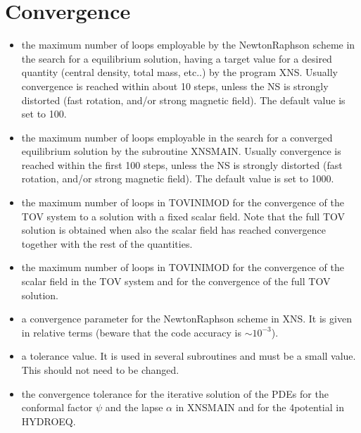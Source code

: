 \documentclass[letterpaper,10pt,english]{sphinxmanual}
\begin{document}
\section{Convergence}
\label{\detokenize{user_params:convergence}}\begin{itemize}
\item {} 
\sphinxAtStartPar
{} \sphinxhyphen{} the maximum number of loops employable by the Newton\sphinxhyphen{}Raphson scheme in the search
for a equilibrium solution, having a target value for a desired quantity (central density, total mass,
etc..) by the program XNS. Usually convergence is reached within about 10 steps, unless the NS is
strongly distorted (fast rotation, and/or strong magnetic field). The default value is set to 100.


\item {} 
\sphinxAtStartPar
{} \sphinxhyphen{} the maximum number of loops employable in the search for a converged equilibrium
solution by the subroutine XNSMAIN. Usually convergence is reached within the first 100 steps,
unless the NS is strongly distorted (fast rotation, and/or strong magnetic field). The default value is
set to 1000.


\item {} 
\sphinxAtStartPar
{} \sphinxhyphen{} the maximum number of loops in TOVINIMOD for the convergence of the TOV system to a solution with a fixed scalar field. Note that the full TOV solution is obtained when also the scalar field has reached convergence together with the rest of the quantities.


\item {} 
\sphinxAtStartPar
{} \sphinxhyphen{} the maximum number of loops in TOVINIMOD for the convergence of the scalar field in the TOV system and for the convergence of the full TOV solution.


\item {} 
\sphinxAtStartPar
{} \sphinxhyphen{} a convergence parameter for the Newton\sphinxhyphen{}Raphson scheme in XNS. It is given in relative terms
(beware that the code accuracy is \(\sim 10^{-3}\)).


\item {} 
\sphinxAtStartPar
{} \sphinxhyphen{} a tolerance value. It is used in several subroutines and must be a small value. This should not
need to be changed.


\item {} 
\sphinxAtStartPar
{} \sphinxhyphen{} the convergence tolerance for the iterative solution of the PDEs for the conformal factor \(\psi\)
and the lapse \(\alpha\) in XNSMAIN and for the 4\sphinxhyphen{}potential in HYDROEQ.



\end{itemize}
\end{document}
